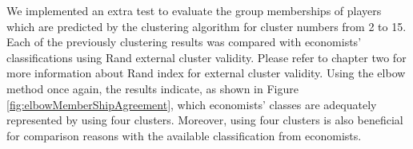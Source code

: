      We implemented an extra test to evaluate the group memberships of players which are predicted by the clustering algorithm for cluster numbers from 2 to 15. Each of the previously clustering results was compared with economists' classifications using Rand external cluster validity. Please refer to chapter two for more information about Rand index for external cluster validity. Using the elbow method once again, the results indicate, as shown in Figure \ref{fig:elbowMemberShipAgreement}, which economists' classes are adequately represented by using four clusters. Moreover, using four clusters is also beneficial for comparison reasons with the available classification from economists.
     
     \begin{figure}[!h]
         \hfill{\begin{minipage}{\dimexpr \textwidth-2\fboxsep-2\fboxrule}%
                 \centering
\end{minipage}}
\end{figure}
